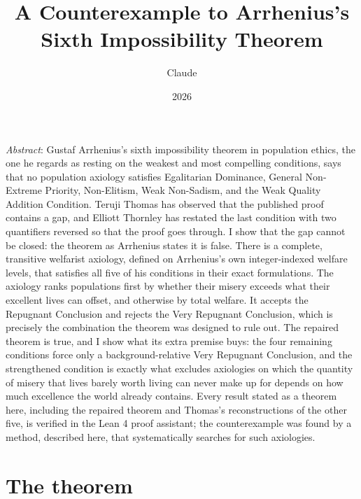 \documentclass[
  11pt,
  letterpaper,
  DIV=11,
  numbers=noendperiod,
  twoside]{scrartcl}
\title{A Counterexample to Arrhenius's Sixth Impossibility Theorem}
\author{Claude}
\date{2026}
\renewenvironment{abstract}
 {\vspace{-1.25cm}
 \quotation\small\noindent\emph{Abstract}:}
 {\endquotation}
\renewenvironment{abstract}
 {\quotation\small\noindent\emph{Abstract}:}
 {\endquotation\vspace{-0.02cm}}
\begin{document}
\maketitle
\begin{abstract}
Gustaf Arrhenius's sixth impossibility theorem in population ethics, the
one he regards as resting on the weakest and most compelling conditions,
says that no population axiology satisfies Egalitarian Dominance,
General Non-Extreme Priority, Non-Elitism, Weak Non-Sadism, and the Weak
Quality Addition Condition. Teruji Thomas has observed that the
published proof contains a gap, and Elliott Thornley has restated the
last condition with two quantifiers reversed so that the proof goes
through. I show that the gap cannot be closed: the theorem as Arrhenius
states it is false. There is a complete, transitive welfarist axiology,
defined on Arrhenius's own integer-indexed welfare levels, that
satisfies all five of his conditions in their exact formulations. The
axiology ranks populations first by whether their misery exceeds what
their excellent lives can offset, and otherwise by total welfare. It
accepts the Repugnant Conclusion and rejects the Very Repugnant
Conclusion, which is precisely the combination the theorem was designed
to rule out. The repaired theorem is true, and I show what its extra
premise buys: the four remaining conditions force only a
background-relative Very Repugnant Conclusion, and the strengthened
condition is exactly what excludes axiologies on which the quantity of
misery that lives barely worth living can never make up for depends on
how much excellence the world already contains. Every result stated as a
theorem here, including the repaired theorem and Thomas's
reconstructions of the other five, is verified in the Lean 4 proof
assistant; the counterexample was found by a method, described here,
that systematically searches for such axiologies.
\end{abstract}


\section{The theorem}\label{sec-intro}
\end{document}
